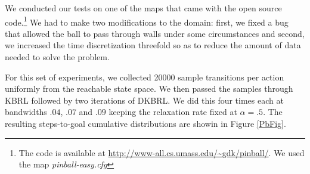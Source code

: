 \documentclass{article} %
\begin{document}
We conducted our tests on one of the maps that came with the open source code.\footnote{
The code is available at \url{http://www-all.cs.umass.edu/~gdk/pinball/}. We used the map
\textit{pinball-easy.cfg}}
We had to make two modifications to the domain: first, we fixed a bug that
allowed the ball to pass through walls under some circumstances and second,
we increased the time discretization threefold so as to reduce the amount of data needed to solve
the problem.

For this set of experiments, we collected 20000 sample transitions per action uniformly from
the reachable state space. We then passed the samples through KBRL followed by two
iterations of DKBRL. We did this four times each at bandwidths $.04$, $.07$ and $.09$ keeping
the relaxation rate fixed at $\alpha=.5$.
The resulting steps-to-goal cumulative distributions are showin in Figure \ref{PbFig}.
\end{document}
